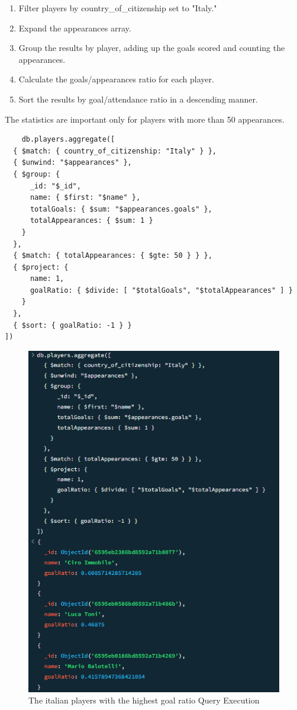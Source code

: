 \documentclass{Configuration_Files/PoliMi3i_thesis}
\begin{document}
\begin{enumerate}
    \item Filter players by country\_of\_citizenship set to "Italy."
    \item Expand the appearances array.
    \item Group the results by player, adding up the goals scored and counting the appearances.
    \item Calculate the goals/appearances ratio for each player.
    \item Sort the results by goal/attendance ratio in a descending manner.
\end{enumerate}
The statistics are important only for players with more than 50 appearances.

\begin{verbatim}
    db.players.aggregate([
  { $match: { country_of_citizenship: "Italy" } },
  { $unwind: "$appearances" },
  { $group: { 
      _id: "$_id", 
      name: { $first: "$name" }, 
      totalGoals: { $sum: "$appearances.goals" }, 
      totalAppearances: { $sum: 1 }
    } 
  },
  { $match: { totalAppearances: { $gte: 50 } } },
  { $project: { 
      name: 1, 
      goalRatio: { $divide: [ "$totalGoals", "$totalAppearances" ] }
    } 
  },
  { $sort: { goalRatio: -1 } }
])
\end{verbatim}

\begin{figure}[htbp]
    \centering
    \includegraphics[scale=1]{Images/Queries/Italian_ratio_goals/irg.png}
    \caption{The italian players with the highest goal ratio Query Execution}
\end{figure}
\end{document}
